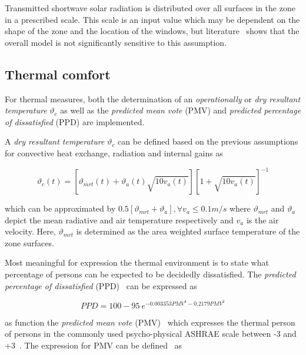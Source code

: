  Transmitted shortwave solar radiation is distributed over all surfaces in the zone in a prescribed scale. This scale is an input value which may be dependent on the shape of the zone and the location of the windows, but literature~\cite{Liesen1997} shows that the overall model is not significantly sensitive to this assumption.

\subsection{Thermal comfort}

For thermal  measures, both the determination of an \emph{operationally} or \emph{dry resultant temperature} $\vartheta_{c}$ as well as the \emph{predicted mean vote} (PMV) and \emph{predicted percentage of dissatisfied} (PPD) are implemented.

 A \emph{dry resultant temperature} $\vartheta_{c}$ can be defined based on the previous assumptions for convective heat exchange, radiation and internal gains as

\begin{equation}
\vartheta_{c}(t) = \left[\vartheta_{mrt}(t)+\vartheta_{a}(t)\sqrt{10v_{a}(t)}\right] \left[1+\sqrt{10v_{a}(t)}\right]^{-1}
\end{equation}

which can be approximated by $0.5\left[\vartheta_{mrt}+\vartheta_{a}\right],\forall v_{a}\leq0.1 m/s$ where $\vartheta_{mrt}$ and $\vartheta_{a}$ depict the mean radiative and air temperature respectively and $v_{a}$ is the air velocity. Here, $\vartheta_{mrt}$ is determined as the area weighted surface temperature of the zone surfaces.

 Most meaningful for expression the thermal environment is to state what percentage of persons can be expected to be decidedly dissatisfied. The \emph{predicted percentage of dissatisfied} (PPD)~\cite{ISO77302005} can be expressed as 

\begin{equation}
PPD = 100 - 95\ e^{-0.003353 PMV^{4} - 0.2179 PMV^{2}}
\end{equation}

as function the \emph{predicted mean vote} (PMV)~\cite{Fanger1970} which expresses the thermal person of persons in the commonly used psycho-physical ASHRAE scale between -3 and +3~\cite{ASHRAE55_2004}. The expression for PMV can be defined~\cite{ISO77302005,ASHRAE2009a} as

